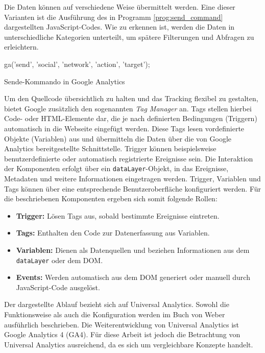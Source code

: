 Die Daten können auf verschiedene Weise übermittelt werden. Eine dieser Varianten ist die Ausführung des in Programm \ref{prog:send_command} dargestellten JavaScript-Codes. Wie zu erkennen ist, werden die Daten in unterschiedliche Kategorien unterteilt, um spätere Filterungen und Abfragen zu erleichtern.

\begin{program}[H]
\begin{JsCode}
ga('send', 'social', 'network', 'action', 'target');
\end{JsCode}
\caption{Sende-Kommando in Google Analytics}
\label{prog:send_command}
\end{program}

Um den Quellcode übersichtlich zu halten und das Tracking flexibel zu gestalten, bietet Google zusätzlich den sogenannten \textit{Tag Manager} an. 
Tags stellen hierbei Code- oder HTML-Elemente dar, die je nach definierten Bedingungen (Triggern) automatisch in die Webseite eingefügt werden. 
Diese Tags lesen vordefinierte Objekte (Variablen) aus und übermitteln die Daten über die von Google Analytics bereitgestellte Schnittstelle. 
Trigger können beispielsweise benutzerdefinierte oder automatisch registrierte Ereignisse sein. 
Die Interaktion der Komponenten erfolgt über ein \texttt{dataLayer}-Objekt, in das Ereignisse, Metadaten und weitere Informationen eingetragen werden. 
Trigger, Variablen und Tags können über eine entsprechende Benutzeroberfläche konfiguriert werden. 
Für die beschriebenen Komponenten ergeben sich somit folgende Rollen:

\begin{itemize}
    \item \textbf{Trigger:} Lösen Tags aus, sobald bestimmte Ereignisse eintreten.
    \item \textbf{Tags:} Enthalten den Code zur Datenerfassung aus Variablen.
    \item \textbf{Variablen:} Dienen als Datenquellen und beziehen Informationen aus dem \texttt{dataLayer} oder dem DOM.
    \item \textbf{Events:} Werden automatisch aus dem DOM generiert oder manuell durch JavaScript-Code ausgelöst.
\end{itemize}

Der dargestellte Ablauf bezieht sich auf Universal Analytics. Sowohl die Funktionsweise als auch die Konfiguration werden im Buch von Weber \cite{weber2015practical} ausführlich beschrieben. Die Weiterentwicklung von Universal Analytics ist Google Analytics 4 (GA4). Für diese Arbeit ist jedoch die Betrachtung von Universal Analytics ausreichend, da es sich um vergleichbare Konzepte handelt.

